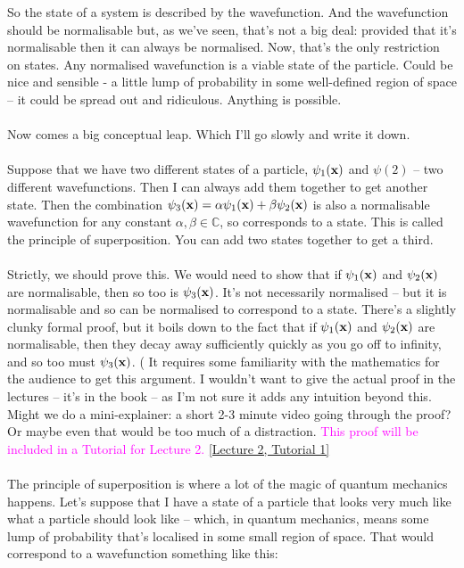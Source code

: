 \documentclass[12pt]{article}
\newcommand\para{\paragraph{}}
\newcommand{\C}{{\mathds C}}
\newcommand{\bx}{{\bf x}}
\newcommand{\alyssa}{\textcolor{magenta}}
\begin{document}
So the state of a system is described by the wavefunction. And the wavefunction should be normalisable but, as we've seen, that's not a big deal: provided that it's normalisable then it can always be normalised. Now, that's the only restriction on states. Any normalised wavefunction is a viable state of the particle. Could be nice and sensible - a little lump of probability in some well-defined region of space -- it could be spread out and ridiculous. Anything is possible. 

\para
Now comes a big conceptual leap. Which I'll go slowly and write it down.

\para
{\color{olive} Suppose that we have two different states of a particle, $\psi_1(\bx)$ and $\psi(2)$} -- two different wavefunctions. Then I can always add them together to get another state. {\color{olive} Then the combination $\psi_3(\bx) = \alpha \psi_1(\bx) + \beta\psi_2(\bx)$ is also a normalisable wavefunction for any constant $\alpha,\beta\in \C$, so corresponds to a state. This is called the principle of superposition. You can add two states together to get a third.}


\para
Strictly, we should prove this. We would need to show that if $\psi_1(\bx)$ and $\psi_2(\bx)$ are normalisable, then so too is $\psi_3(\bx)$. It's not necessarily normalised -- but it is normalisable and so can be normalised to correspond to a state. There's a slightly clunky formal proof, but it boils down to the fact that if $\psi_1(\bx)$ and $\psi_2(\bx)$ are normalisable, then they decay away sufficiently quickly as you go off to infinity, and so too must $\psi_3(\bx)$. ({\color{blue} It requires some familiarity with the mathematics for the audience to get this argument. I wouldn't want to give the actual proof in the lectures -- it's in the book -- as I'm not sure it adds any intuition beyond this. Might we do a mini-explainer: a short 2-3 minute video going through the proof? Or maybe even that would be too much of a distraction.} \alyssa{This proof will be included in a Tutorial for Lecture 2.} \href{https://drive.google.com/file/d/15D_utjt-mdNEDmhK1WxOPFAAx-HqOa1U/view?usp=drive_link}{[Lecture 2, Tutorial 1]}


\para
The principle of superposition is where a lot of the magic of quantum mechanics happens. Let's suppose that I have a state of a particle that looks very much like what a particle should look like -- which, in quantum mechanics, means some lump of probability that's localised in some small region of space. That would correspond to a wavefunction something like this:
\end{document}
